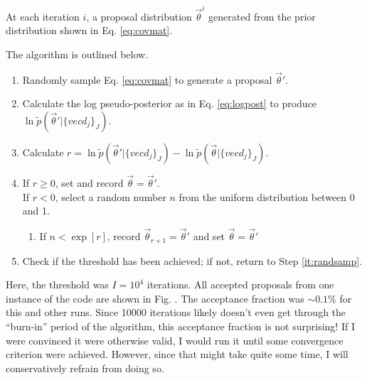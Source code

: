 \documentclass[12pt, onecolumn]{emulateapj}
\begin{document}
At each iteration $i$, a proposal distribution $\vec{\theta}^{i}$ generated from the prior distribution shown in Eq. \ref{eq:covmat}.  %


The algorithm is outlined below.

\begin{enumerate}
\item \label{it:randsamp} Randomly sample Eq. \ref{eq:covmat} to generate a proposal $\vec{\theta}'$.
\item Calculate the log pseudo-posterior as in Eq. \ref{eq:logpost} to produce $\ln\tilde{p}(\vec{\theta}'|\{vec{d}_{j}\}_{J})$.
\item Calculate $r=\ln\tilde{p}(\vec{\theta}'|\{vec{d}_{j}\}_{J})-\ln\tilde{p}(\vec{\theta}|\{vec{d}_{j}\}_{J})$.
\item If $r\geq0$, set and record $\vec{\theta}=\vec{\theta}'$.\\
If $r<0$, select a random number $n$ from the uniform distribution between 0 and 1.
\begin{enumerate}
\item If $n<\exp[r]$, record $\vec{\theta}_{r+1}=\vec{\theta}'$ and set $\vec{\theta}=\vec{\theta}'$
\end{enumerate}
\item Check if the threshold has been achieved; if not, return to Step \ref{it:randsamp}.
\end{enumerate}

Here, the threshold was $I=10^{4}$ iterations.  All accepted proposals from one instance of the code are shown in Fig. %
.  The acceptance fraction was $\sim0.1\%$ for this and other runs.  Since 10000 iterations likely doesn't even get through the ``burn-in'' period of the algorithm, this acceptance fraction is not surprising!  If I were convinced it were otherwise valid, I would run it until some convergence criterion were achieved.  However, since that might take quite some time, I will conservatively refrain from doing so.
\end{document}
